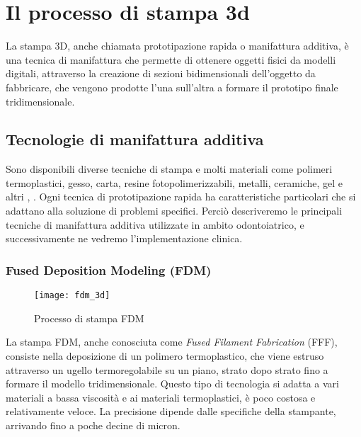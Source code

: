 
\chapter{Il processo di stampa 3d} %

\label{Chapter5} %




La stampa 3D, anche chiamata prototipazione rapida o manifattura additiva, è una tecnica di manifattura che permette di ottenere oggetti fisici da modelli digitali, attraverso la creazione di sezioni bidimensionali dell'oggetto da fabbricare, che vengono prodotte l'una sull'altra a formare il prototipo finale tridimensionale.

\section{Tecnologie di manifattura additiva}
Sono disponibili diverse tecniche di stampa e molti materiali come polimeri termoplastici, gesso, carta, resine fotopolimerizzabili, metalli, ceramiche, gel e altri \parencite{Reference119}, \parencite{Reference120}. Ogni tecnica di prototipazione rapida ha caratteristiche particolari che si adattano alla soluzione di problemi specifici. Perciò descriveremo le principali tecniche di manifattura additiva utilizzate in ambito odontoiatrico, e successivamente ne vedremo l'implementazione clinica.

\subsection{Fused Deposition Modeling (FDM)}
\begin{wrapfigure} {R} {0.4\textwidth}
\vspace{-40pt}
	\begin{center}
	\texttt{[image: fdm\_3d]}
    \caption{Processo di stampa FDM}
    \label{fig:fdm_3d}
	\end{center}
\vspace{-40pt}
\end{wrapfigure}
La stampa FDM, anche conosciuta come \emph{Fused Filament Fabrication} (FFF), consiste nella deposizione di un polimero termoplastico, che viene estruso attraverso un ugello termoregolabile su un piano, strato dopo strato fino a formare il modello tridimensionale. Questo tipo di tecnologia si adatta a vari materiali a bassa viscosità e ai materiali termoplastici, è poco costosa e relativamente veloce. La precisione dipende dalle specifiche della stampante, arrivando fino a poche decine di micron. 
\pagebreak
